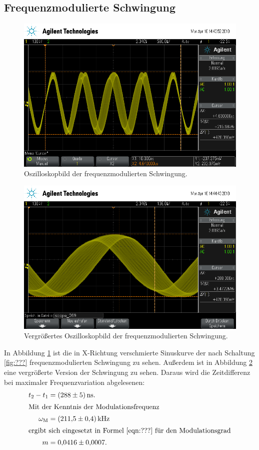 \subsection{Frequenzmodulierte Schwingung}

\begin{figure}[h]
  \centering
  \includegraphics[width=.9\textwidth]{Oszi_Pics/freqModRing.png}
  \caption{Oszilloskopbild der frequenzmodulierten Schwingung.}
  \label{fig:freqModRing}
\end{figure}

\begin{figure}[h]
  \centering
  \includegraphics[width=.9\textwidth]{Oszi_Pics/freqModZoom.png}
  \caption{Vergrößertes Oszilloskopbild der frequenzmodulierten Schwingung.}
  \label{fig:freqModZoom}
\end{figure}

In Abbildung \ref{fig:freqModRing} ist die in X-Richtung verschmierte Sinuskurve der nach Schaltung \ref{fig:???} frequenzmodulierten Schwingung zu sehen. Außerdem ist in Abbildung \ref{fig:freqModZoom} eine vergrößerte Version der Schwingung zu sehen. Daraus wird die Zeitdifferenz bei maximaler Frequenzvariation abgelesenen:
\begin{align*}
  t_2 - t_1 &= \SI{288(5)}{\nano\second}.\\
\intertext{Mit der Kenntnis der Modulationsfrequenz}
  \omega_\text{M} &= \SI{211.5(4)}{\kilo\hertz}\\
\intertext{ergibt sich eingesetzt in Formel \eqref{eqn:???} für den Modulationsgrad}
  m &= \num{0.0416(7)}.
\end{align*}


